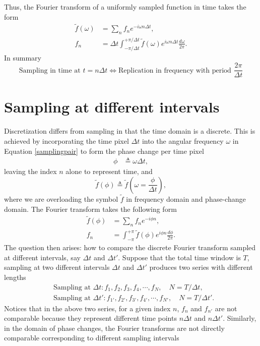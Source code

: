 \documentclass[
10pt, %
a4paper, %
oneside, %
headinclude,footinclude, %
BCOR5mm, %
]{scrartcl}
\begin{document}
Thus, the Fourier transform of a uniformly sampled function in time takes the form
\begin{align}\label{samplingpair}
\tilde{f}(\omega) &= \sum_n f_n e^{-i\omega n \Delta t}, \\
f_n &= \Delta t\int_{-\pi/\Delta t}^{+\pi/\Delta t} \tilde{f}(\omega)e^{i\omega n\Delta t}\frac{d\omega}{2\pi}.
\end{align}
In summary
$$
\boxed{\text{Sampling in time at }t=n\Delta t \Leftrightarrow \text{Replication in frequency with period }  \frac{2\pi}{\Delta t}}
$$
 
\section{Sampling at different intervals}
Discretization differs from sampling in that the time domain is a discrete. This is achieved by incorporating the time pixel $\Delta t$ into the angular frequency $\omega$ in Equation \ref{samplingpair} to form the phase change per time pixel
\begin{align}
\phi &\triangleq \omega \Delta t,
\end{align}
leaving the index $n$ alone to represent time, and
\begin{equation}
\tilde{f}(\phi) \triangleq \tilde{f}\left(\omega = \frac{\phi}{\Delta t}\right),
\end{equation}
where we are overloading the symbol $\tilde{f}$ in frequency domain and phase-change domain. The Fourier transform takes the following form
\begin{align}
\tilde{f}(\phi) &= \sum_n f_n e^{-i\phi n }, \\
f_n &= \int_{-\pi}^{+\pi} \tilde{f}(\phi)e^{i\phi n}\frac{d\phi}{2\pi}.
\end{align}
The question then arises: how to compare the discrete Fourier transform sampled at different intervals, say $\Delta t$ and $\Delta t'$. Suppose that the total time window is $T$, sampling at two different intervals $\Delta t$ and $\Delta t'$ produces two series with different lengths
\begin{align}
\nonumber &\text{Sampling at } \Delta t: f_1, f_2, f_3, f_4, \cdots, f_N, \quad N = T/\Delta t,\\
\nonumber &\text{Sampling at } \Delta t': f_{1'}, f_{2'}, f_{3'}, f_{4'}, \cdots, f_{N'}, \quad N = T/\Delta t'.
\end{align}
Notices that in the above two series, for a given index $n$, $f_n$ and $f_{n'}$ are not comparable because they represent different time points $n\Delta t$ and $n\Delta t'$. Similarly, in the domain of phase changes, the Fourier transforms are not directly comparable corresponding to different sampling intervals
\end{document}
